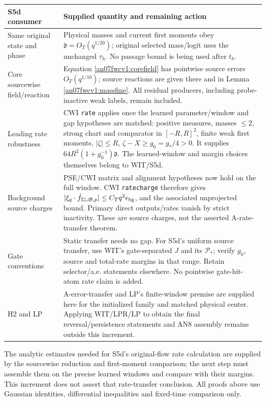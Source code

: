 \documentclass[11pt]{article}
\numberwithin{equation}{section}
\newcommand{\dist}{\mathfrak d}\newcommand{\one}{\mathbf1}
\begin{document}
\small
\begin{longtable}{>{\raggedright\arraybackslash}p{}
 >{\raggedright\arraybackslash}p{}}
\toprule S5d consumer & Supplied quantity and remaining action\\\midrule\endhead
Same original state and phase
& Physical masses and current first moments obey
 \(\dist=O_T(q^{1/20})\); original selected mass/logit uses the
 unchanged \(\tau_h\). No passage bound is being used after \(t_b\).\\
Core sourcewise field/reaction
& Equation \eqref{an07fwcv1:corefield} has pointwise
 source errors \(O_T(q^{1/10})\); source reactions are given
 there and in Lemma \ref{an07fwcv1:massfine}. All residual
 producers, including probe-inactive weak labels, remain included.\\
Leading rate robustness
& CWI \texttt{rate} applies once the learned parameter/window
 and gap hypotheses are matched: positive measures, masses
 \(\le2\), strong chart and comparator in \([-R,R]^2\), finite
 weak first moments, \(|\zeta|\le R\),
 \(\zeta-X\ge g_0=g_*/4>0\). It supplies
 \(64R^2(1+g_0^{-1})\dist\). The learned-window and margin
 choices themselves belong to WIT/S5d.\\
Background source charges
& PSE/CWI matrix and alignment hypotheses now hold on the
 full window. CWI \texttt{ratecharge} therefore gives
 \(|\xi_q\cdot\dot f_{\Sigma\cup\mathcal B,p}|
 \le C_Tq^2\epsilon_{\rm bg}\), and the associated unprojected
 bound. Primary direct outputs/rates vanish by strict inactivity.
 These are source charges, not the asserted A-rate-transfer theorem.\\
Gate conventions
& Static transfer needs no gap. For S5d's uniform source transfer,
 use WIT's gate-separated \(J\) and its \(\mathcal P_*\);
 verify \(g_0\), source and total-rate margins in that range.
 Retain selector/a.e. statements elsewhere. No pointwise
 gate-hit-atom rate claim is added.\\
H2 and LP
& A-error-transfer and LP's finite-window premise are supplied
 here for the initialized family and matched physical center.
 Applying WIT/LPR/LP to obtain the final reversal/persistence
 statements and AN8 assembly remains outside this increment.\\
\bottomrule
\end{longtable}\normalsize
The analytic estimates needed for S5d's original-flow rate calculation
are supplied by the sourcewise reduction and first-moment comparison;
the next step must assemble them on the precise learned windows and
compare with their margins. This increment does not assert that
rate-transfer conclusion. All proofs above use Gaussian identities,
differential inequalities and fixed-time comparison only.
\end{document}

